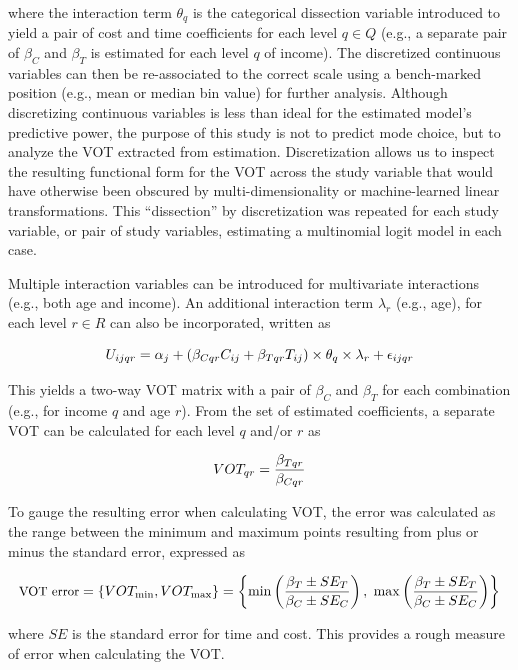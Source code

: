 \documentclass[numbered]{trbunofficial}\usepackage[]{graphicx}\usepackage[]{color}
\begin{document}
\noindent where the interaction term $\theta_q$ is the categorical dissection variable introduced to yield a pair of cost and time coefficients for each level $q \in Q$ (e.g., a separate pair of $\beta_C$ and $\beta_T$ is estimated for each level $q$ of income).  The discretized continuous variables can then be re-associated to the correct scale using a bench-marked position (e.g., mean or median bin value) for further analysis. Although discretizing continuous variables is less than ideal for the estimated model's predictive power, the purpose of this study is not to predict mode choice, but to analyze the VOT extracted from estimation. Discretization allows us to inspect the resulting functional form for the VOT across the study variable that would have otherwise been obscured by multi-dimensionality or machine-learned linear transformations. This ``dissection'' by discretization was repeated for each study variable, or pair of study variables, estimating a multinomial logit model in each case. 

Multiple interaction variables can be introduced for multivariate interactions (e.g., both age and income). An additional interaction term $\lambda_r$ (e.g., age), for each level $r \in R$ can also be incorporated, written as

\begin{equation}
  \label{eq:twointeract}
  \small
  U_{ijqr} = \alpha_{j} + \left( \beta_{Cqr} C_{ij} + \beta_{Tqr} T_{ij} \right) \times \theta_{q} \times \lambda_{r} + \epsilon_{ijqr}
\end{equation}

\noindent This yields a two-way VOT matrix with a pair of $\beta_C$ and $\beta_T$ for each combination (e.g., for income $q$ and age $r$). From the set of estimated coefficients, a separate VOT can be calculated for each level $q$ and/or $r$ as\vspace{3pt}

\begin{equation}
  \small
    VOT_{qr} = \frac{\beta_{Tqr}}{\beta_{Cqr}}
\end{equation}

To gauge the resulting error when calculating VOT, the error was calculated as the range between the minimum and maximum points resulting from plus or minus the standard error, expressed as

\begin{ceqn}
\begin{equation}\label{eq:error}
  \small
  \text{VOT error} = \left\{VOT_{\min}, VOT_{\max}\right\} = \left\{ \min \left(\frac{\beta_T \pm SE_T}{\beta_C \pm SE_C} \right),~ \max\left(\frac{\beta_T \pm SE_T}{\beta_C \pm SE_C} \right) \right\}
\end{equation}
\end{ceqn}
\noindent where $SE$ is the standard error for time and cost. This provides a rough measure of error when calculating the VOT. 
\end{document}
